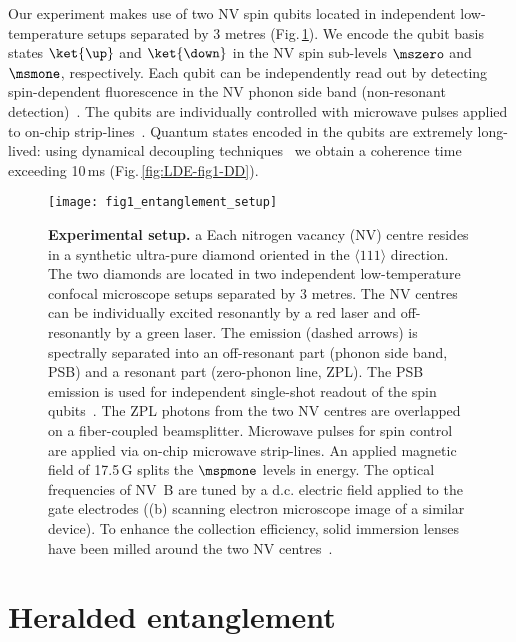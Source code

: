 Our experiment makes use of two NV spin qubits located in independent low-temperature setups separated by 3 metres (Fig.\,\ref{fig:LDE-fig1-setup}). We encode the qubit basis states $\ket{\up}$ and $\ket{\down}$ in the NV spin sub-levels $\mszero$ and $\msmone$, respectively. Each qubit can be independently read out by detecting spin-dependent fluorescence in the NV phonon side band (non-resonant detection)~\cite{Robledo_Nature_2011}. The qubits are individually controlled with microwave pulses applied to on-chip strip-lines~\cite{Lange_Science_2010}. Quantum states encoded in the qubits are extremely long-lived: using dynamical decoupling techniques~\cite{Lange_Science_2010} we obtain a coherence time exceeding 10$\,$ms (Fig.\,\ref{fig:LDE-fig1-DD}).

\begin{figure}[tp]
	\centering
	\texttt{[image: fig1\_entanglement\_setup]}
	\caption{\label{fig:LDE-fig1-setup} \textbf{Experimental setup.} a Each nitrogen vacancy (NV) centre resides in a synthetic ultra-pure diamond oriented in the $\langle 111\rangle$ direction. The two diamonds are located in two independent low-temperature confocal microscope setups separated by 3 metres. The NV centres can be individually excited resonantly by a red laser and off-resonantly by a green laser. The emission (dashed arrows) is spectrally separated into an off-resonant part (phonon side band, PSB) and a resonant part (zero-phonon line, ZPL). The PSB emission is used for independent single-shot readout of the spin qubits~\cite{Robledo_Nature_2011}. The ZPL photons from the two NV centres are overlapped on a fiber-coupled beamsplitter. Microwave pulses for spin control are applied via on-chip microwave strip-lines. An applied magnetic field of 17.5\,G splits the $\mspmone$ levels in energy. The optical frequencies of NV~B are tuned by a d.c. electric field applied to the gate electrodes ((b) scanning electron microscope image of a similar device). To enhance the collection efficiency, solid immersion lenses have been milled around the two NV centres~\cite{Robledo_Nature_2011}. }
\end{figure}

	
\section{Heralded entanglement}\label{sec:HE}

